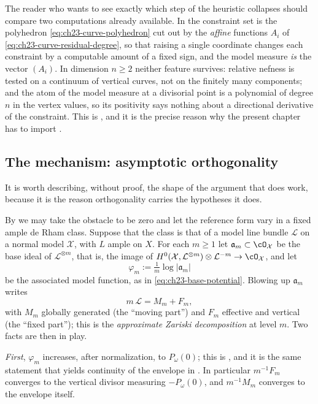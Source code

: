 The reader who wants to see exactly which step of the heuristic collapses
should compare two computations already available.  In
 the constraint set is the
polyhedron \eqref{eq:ch23-curve-polyhedron} cut out by the \emph{affine}
functions \(A_i\) of \eqref{eq:ch23-curve-residual-degree}, so that raising a
single coordinate changes each constraint by a computable amount of a fixed
sign, and the model measure \emph{is} the vector \((A_i)\).  In dimension
\(n\geq2\) neither feature survives: relative nefness is tested on a
continuum of vertical curves, not on the finitely many components; and the
atom of the model measure at a divisorial point is a polynomial of degree
\(n\) in the vertex values, so its positivity says nothing about a
directional derivative of the constraint.  This is
, and it is the precise reason why the
present chapter has to import .

\subsection{The mechanism: asymptotic orthogonality}
\label{sec:ch27-orthogonality-mechanism}

It is worth describing, without proof, the shape of the argument that does
work, because it is the reason orthogonality carries the hypotheses it
does.

By  we may take the obstacle
to be zero and let the reference form vary in a fixed ample de Rham class.
Suppose that the class is that of a model line bundle \(\mathcal L\) on a
normal model \(\mathcal X\), with \(L\) ample on \(X\).  For each \(m\geq1\)
let \(\mathfrak a_m\subset\cO_{\mathcal X}\) be the base ideal of
\(\mathcal L^{\otimes m}\), that is, the image of
\(H^0(\mathcal X,\mathcal L^{\otimes m})\otimes\mathcal L^{-m}
 \to\cO_{\mathcal X}\), and let
\[
 \varphi_m:=\tfrac1m\log|\mathfrak a_m|
\]
be the associated model function, as in
\eqref{eq:ch23-base-potential}.  Blowing up \(\mathfrak a_m\) writes
\[
 m\,\mathcal L=M_m+F_m,
\]
with \(M_m\) globally generated (the ``moving part'') and \(F_m\) effective
and vertical (the ``fixed part''); this is the \emph{approximate Zariski
decomposition} at level \(m\).  Two facts are then in play.

\emph{First}, \(\varphi_m\) increases, after normalization, to
\(P_\omega(0)\); this is
, and it is the same statement that
yields continuity of the envelope in .  In
particular \(m^{-1}F_m\) converges to the vertical divisor measuring
\(-P_\omega(0)\), and \(m^{-1}M_m\) converges to the envelope itself.


